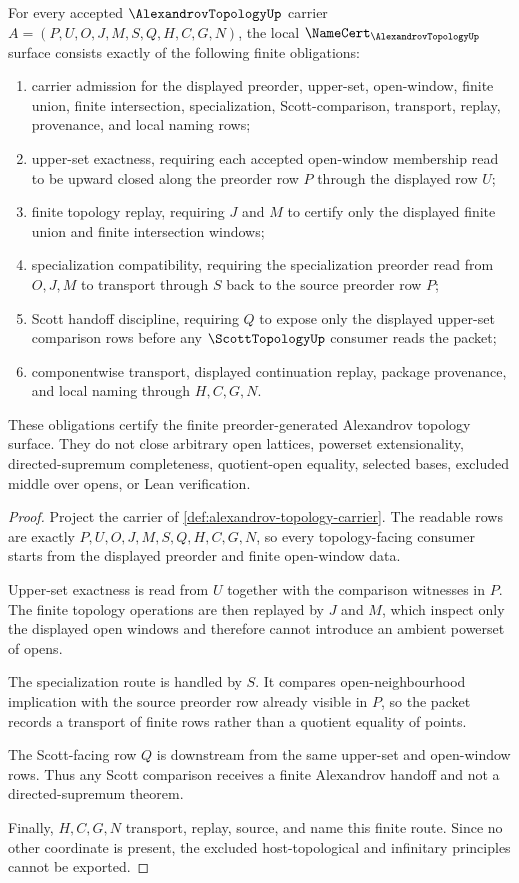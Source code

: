 \begin{theorem}\label{thm:alexandrov-topology-namecert-obligations}
For every accepted $\AlexandrovTopologyUp$ carrier $A=(P,U,O,J,M,S,Q,H,C,G,N)$, the local $\NameCert_{\AlexandrovTopologyUp}$ surface consists exactly of the following finite obligations:
\begin{enumerate}
\item carrier admission for the displayed preorder, upper-set, open-window, finite union, finite intersection, specialization, Scott-comparison, transport, replay, provenance, and local naming rows;
\item upper-set exactness, requiring each accepted open-window membership read to be upward closed along the preorder row $P$ through the displayed row $U$;
\item finite topology replay, requiring $J$ and $M$ to certify only the displayed finite union and finite intersection windows;
\item specialization compatibility, requiring the specialization preorder read from $O,J,M$ to transport through $S$ back to the source preorder row $P$;
\item Scott handoff discipline, requiring $Q$ to expose only the displayed upper-set comparison rows before any $\ScottTopologyUp$ consumer reads the packet;
\item componentwise transport, displayed continuation replay, package provenance, and local naming through $H,C,G,N$.
\end{enumerate}
These obligations certify the finite preorder-generated Alexandrov topology surface. They do not close arbitrary open lattices, powerset extensionality, directed-supremum completeness, quotient-open equality, selected bases, excluded middle over opens, or Lean verification.
\end{theorem}
\begin{proof}
Project the carrier of \autoref{def:alexandrov-topology-carrier}. The readable rows are exactly $P,U,O,J,M,S,Q,H,C,G,N$, so every topology-facing consumer starts from the displayed preorder and finite open-window data.

Upper-set exactness is read from $U$ together with the comparison witnesses in $P$. The finite topology operations are then replayed by $J$ and $M$, which inspect only the displayed open windows and therefore cannot introduce an ambient powerset of opens.

The specialization route is handled by $S$. It compares open-neighbourhood implication with the source preorder row already visible in $P$, so the packet records a transport of finite rows rather than a quotient equality of points.

The Scott-facing row $Q$ is downstream from the same upper-set and open-window rows. Thus any Scott comparison receives a finite Alexandrov handoff and not a directed-supremum theorem.

Finally, $H,C,G,N$ transport, replay, source, and name this finite route. Since no other coordinate is present, the excluded host-topological and infinitary principles cannot be exported.
\end{proof}

